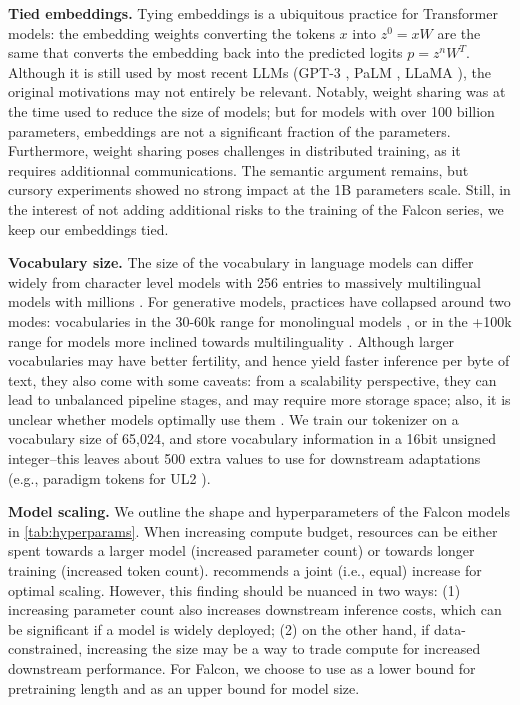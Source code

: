 \documentclass{article}
\begin{document}
\textbf{Tied embeddings.} Tying embeddings is a ubiquitous practice for Transformer models: the embedding weights converting the tokens $x$ into $z^0=xW$ are the same that converts the embedding back into the predicted logits $p=z^n W^T$. Although it is still used by most recent LLMs (GPT-3 \citet{brown2020gpt3}, PaLM \citet{palm}, LLaMA \citet{llama}), the original motivations \citep{press2016tied, inan2016tying} may not entirely be relevant. Notably, weight sharing was at the time used to reduce the size of models; but for models with over 100 billion parameters, embeddings are not a significant fraction of the parameters. Furthermore, weight sharing poses challenges in distributed training, as it requires additionnal communications. The semantic argument remains, but cursory experiments showed no strong impact at the 1B parameters scale. Still, in the interest of not adding additional risks to the training of the Falcon series, we keep our embeddings tied.

\textbf{Vocabulary size.} The size of the vocabulary in language models can differ widely from character level models with 256 entries \citep{xue2022byt5} to massively multilingual models with millions \citep{liang2023xlmvocab}. For generative models, practices have collapsed around two modes: vocabularies in the 30-60k range for monolingual models \citep{brown2020gpt3, gopher, llama}, or in the +100k range for models more inclined towards multilinguality \citep{bloom, palm}. Although larger vocabularies may have better fertility, and hence yield faster inference per byte of text, they also come with some caveats: from a scalability perspective, they can lead to unbalanced pipeline stages, and may require more storage space; also, it is unclear whether models optimally use them \citep{J1WhitePaper}. We train our tokenizer on a vocabulary size of 65,024, and store vocabulary information in a 16bit unsigned integer--this leaves about 500 extra values to use for downstream adaptations (e.g., paradigm tokens for UL2 \citet{tay2022transcending}).

\textbf{Model scaling.} We outline the shape and hyperparameters of the Falcon models in \cref{tab:hyperparams}. When increasing compute budget, resources can be either spent towards a larger model (increased parameter count) or towards longer training (increased token count). \citet{hoffmann2022training} recommends a joint (i.e., equal) increase for optimal scaling. However, this finding should be nuanced in two ways: (1) increasing parameter count also increases downstream inference costs, which can be significant if a model is widely deployed; (2) on the other hand, if data-constrained, increasing the size may be a way to trade compute for increased downstream performance. For Falcon, we choose to use \citet{hoffmann2022training} as a lower bound for pretraining length and as an upper bound for model size.  
\end{document}
